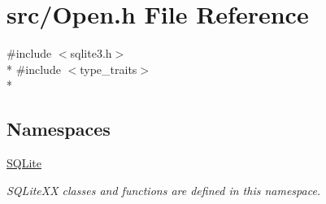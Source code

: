 \hypertarget{a00028}{\section{src/\-Open.h File Reference}
\label{a00028}
}
{\ttfamily \#include $<$sqlite3.\-h$>$}\\*
{\ttfamily \#include $<$type\-\_\-traits$>$}\\*
\subsection*{Namespaces}
\begin{DoxyCompactItemize}
\item 
\hyperlink{a00038}{S\-Q\-Lite}
\begin{DoxyCompactList}\small\item\em S\-Q\-Lite\-X\-X classes and functions are defined in this namespace. \end{DoxyCompactList}\end{DoxyCompactItemize}

